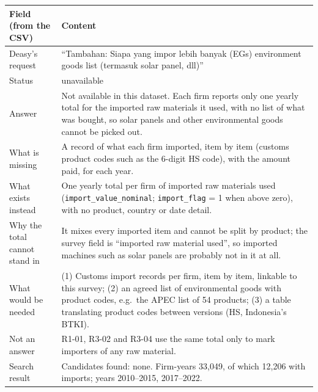 {\footnotesize
\begin{tabularx}{\linewidth}{@{}>{\raggedright\arraybackslash}p{3.6cm}X@{}}
\toprule
Field (from the CSV) & Content \\
\midrule
Deasy's request & ``Tambahan: Siapa yang impor lebih banyak (EGs) environment goods list (termasuk solar panel, dll)'' \\
Status & unavailable \\
Answer & Not available in this dataset. Each firm reports only one yearly total for the imported raw materials it used,
  with no list of what was bought, so solar panels and other environmental goods cannot be picked out. \\
What is missing & A record of what each firm imported, item by item (customs product codes such as the 6-digit HS code),
  with the amount paid, for each year. \\
What exists instead & One yearly total per firm of imported raw materials used (\texttt{import\_value\_nominal};
  \texttt{import\_flag} = 1 when above zero), with no product, country or date detail. \\
Why the total cannot stand in & It mixes every imported item and cannot be split by product; the survey field is
  ``imported raw material used'', so imported machines such as solar panels are probably not in it at all. \\
What would be needed & (1) Customs import records per firm, item by item, linkable to this survey; (2) an agreed list of
  environmental goods with product codes, e.g.\ the APEC list of 54 products; (3) a table translating product codes
  between versions (HS, Indonesia's BTKI). \\
Not an answer & R1-01, R3-02 and R3-04 use the same total only to mark importers of any raw material. \\
Search result & Candidates found: none. Firm-years 33,049, of which 12,206 with imports; years 2010--2015, 2017--2022. \\
\bottomrule
\end{tabularx}}
